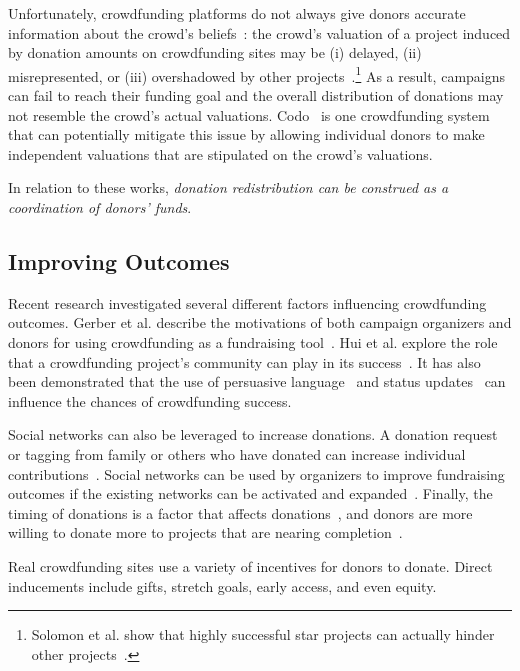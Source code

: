 Unfortunately, crowdfunding platforms do not always give donors accurate information about the crowd's beliefs~\cite{wash-time}: the crowd's valuation of a project induced by donation amounts on crowdfunding sites may be (i) delayed, 
(ii) misrepresented, 
or (iii) overshadowed by other projects~\cite{wash-time, andreoni1988free, wash-skew}.\footnote{Solomon et al. show that highly successful star projects can actually hinder other projects~\cite{wash-skew}.} As a result, campaigns can fail to reach their funding goal and the overall distribution of donations may not resemble the crowd's actual valuations. Codo~\cite{codo} is one crowdfunding system that can potentially mitigate this issue by allowing individual donors to make independent valuations that are stipulated on the crowd's valuations. 

In relation to these works, \textit{donation redistribution can be construed as a coordination of donors' funds}. 


\subsection{Improving Outcomes}

Recent research investigated several different factors influencing crowdfunding outcomes. Gerber et al. describe the motivations of both campaign organizers and donors for using crowdfunding as a fundraising tool~\cite{Gerber:2013:CMD:2562181.2530540}. Hui et al. explore the role that a crowdfunding project's community can play in its success~\cite{Hui:2014:URC:2531602.2531715}. It has also been demonstrated that the use of persuasive language~\cite{Mitra:2014:LGP:2531602.2531656} and status updates~\cite{xu2014show} can influence the chances of crowdfunding success. 

Social networks can also be leveraged to increase donations. A donation request or tagging from family or others who have donated can increase individual contributions~\cite{cotterill2011impacts}. Social networks can be used by organizers to improve fundraising outcomes if the existing networks can be activated and expanded~\cite{Hui:2014:ULS:2598510.2598539}. 
Finally, the timing of donations is a factor that affects donations~\cite{wash-time}, and donors are more willing to donate more to projects that are nearing completion~\cite{complete-effect}.

Real crowdfunding sites use a variety of incentives for donors to donate. Direct inducements include gifts, stretch goals, early access, and even equity.


